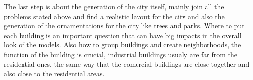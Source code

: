 The last step is about the generation of the city itself, mainly join all the problems stated above and find a realistic layout for the city and also the generation of the ornamentations for the city like trees and parks. Where to put each building is an important question that can have big impacts in the overall look of the models. Also how to group buildings and create neighborhoods, the function of the building is crucial, industrial buildings usualy are far from the residential ones, the same way that the comercial buildings are close together and also close to the residential areas.















%


